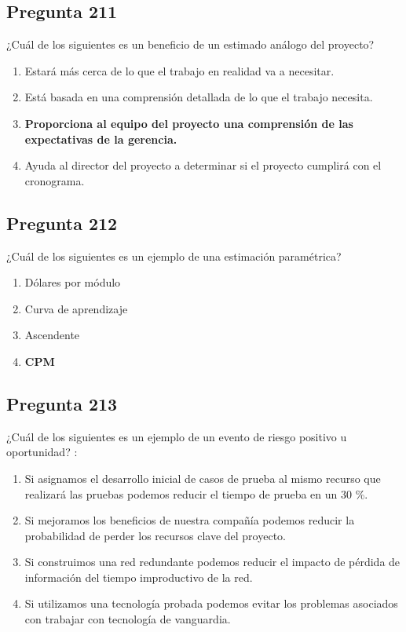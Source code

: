 \documentclass[11pt,a4paper]{article}
\begin{document}
\subsection*{Pregunta 211}
¿Cuál de los siguientes es un beneficio de un estimado análogo del proyecto?

\begin{enumerate}[label=\alph*)]
  \item Estará más cerca de lo que el trabajo en realidad va a necesitar.
  \item Está basada en una comprensión detallada de lo que el trabajo necesita.
  \item \textbf{Proporciona al equipo del proyecto una comprensión de las expectativas de la gerencia.}
  \item Ayuda al director del proyecto a determinar si el proyecto cumplirá con el cronograma.
\end{enumerate}

\subsection*{Pregunta 212}
¿Cuál de los siguientes es un ejemplo de una estimación paramétrica?

\begin{enumerate}[label=\alph*)]
  \item Dólares por módulo
  \item Curva de aprendizaje
  \item Ascendente
  \item \textbf{CPM}
\end{enumerate}

\subsection*{Pregunta 213}
¿Cuál de los siguientes es un ejemplo de un evento de riesgo positivo u oportunidad? :

\begin{enumerate}[label=\alph*)]
  \item Si asignamos el desarrollo inicial de casos de prueba al mismo recurso que realizará las pruebas podemos reducir el tiempo de prueba en un 30 \%.
  \item Si mejoramos los beneficios de nuestra compañía podemos reducir la probabilidad de perder los recursos clave del proyecto.
  \item Si construimos una red redundante podemos reducir el impacto de pérdida de información del tiempo improductivo de la red.
  \item Si utilizamos una tecnología probada podemos evitar los problemas asociados con trabajar con tecnología de vanguardia.
\end{enumerate}
\end{document}
